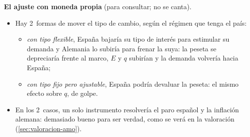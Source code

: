 \documentclass[11pt]{article}
\begin{document}
\begin{anotaciones}
\textbf{El ajuste con moneda propia} (para consultar; no se canta).
\begin{itemize}
\item Hay 2~formas de mover el tipo de cambio, según el régimen que tenga el país:
  \begin{itemize}
  \item \emph{con tipo flexible}, España bajaría su tipo de interés para estimular su demanda y Alemania lo subiría para frenar la suya: la peseta se depreciaría frente al marco, $E$ y $q$ subirían y la demanda volvería hacia España;
  \item \emph{con tipo fijo pero ajustable}, España podría devaluar la peseta: el mismo efecto sobre $q$, de golpe.
  \end{itemize}
\item En los 2~casos, un solo instrumento resolvería el paro español y la inflación alemana: demasiado bueno para ser verdad, como se verá en la valoración (\ref{sec:valoracion-amo}).
\end{itemize}
\begin{figuracaja}
\caption{El ajuste con moneda propia: la depreciación devuelve la demanda a su sitio}\label{fig:mundell-devaluacion}
\end{figuracaja}
\end{anotaciones}
\end{document}
